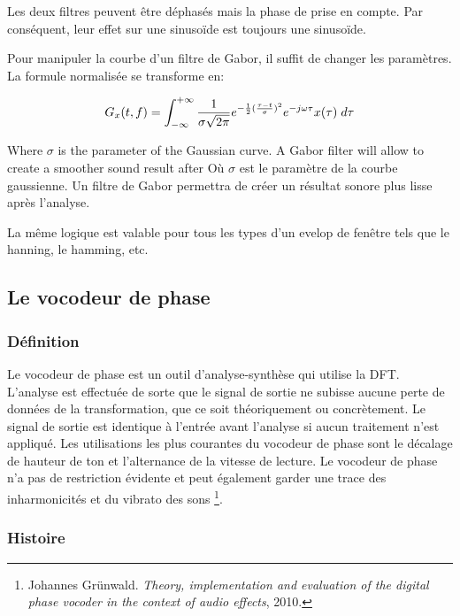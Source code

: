 Les deux filtres peuvent être déphasés mais la phase de prise en compte. Par conséquent, leur effet sur une sinusoïde est toujours une sinusoïde.

Pour manipuler la courbe d'un filtre de Gabor, il suffit de changer les paramètres. La formule normalisée se transforme en:

\begin{equation}
    G_x(t,f) = \int_{-\infty}^{+\infty} \frac{1}{\sigma \sqrt{2 \pi}} e ^ {-\frac{1}{2}(\frac{\tau-t}{\sigma})^2} e ^ {-j\omega \tau} x(\tau)\hspace{1mm} d\tau  
\end{equation}

Where $\sigma$ is the parameter of the Gaussian curve. A Gabor filter will allow to create a smoother sound result after Où $ \sigma $ est le paramètre de la courbe gaussienne. Un filtre de Gabor permettra de créer un résultat sonore plus lisse après l'analyse.

La même logique est valable pour tous les types d’un evelop de fenêtre tels que le hanning, le hamming, etc.

    \subsection{Le vocodeur de phase}    
    
        \subsubsection{Définition}   

Le vocodeur de phase est un outil d'analyse-synthèse qui utilise la DFT. L'analyse est effectuée de sorte que le signal de sortie ne subisse aucune perte de données de la transformation, que ce soit théoriquement ou concrètement. Le signal de sortie est identique à l'entrée avant l'analyse si aucun traitement n'est appliqué. Les utilisations les plus courantes du vocodeur de phase sont le décalage de hauteur de ton et l’alternance de la vitesse de lecture. Le vocodeur de phase n’a pas de restriction évidente et peut également garder une trace des inharmonicités et du vibrato des sons \footnote {Johannes Grünwald. \textit{Theory, implementation and evaluation of the digital phase vocoder in the context of audio effects}, 2010.}.

        \subsubsection{Histoire} 

